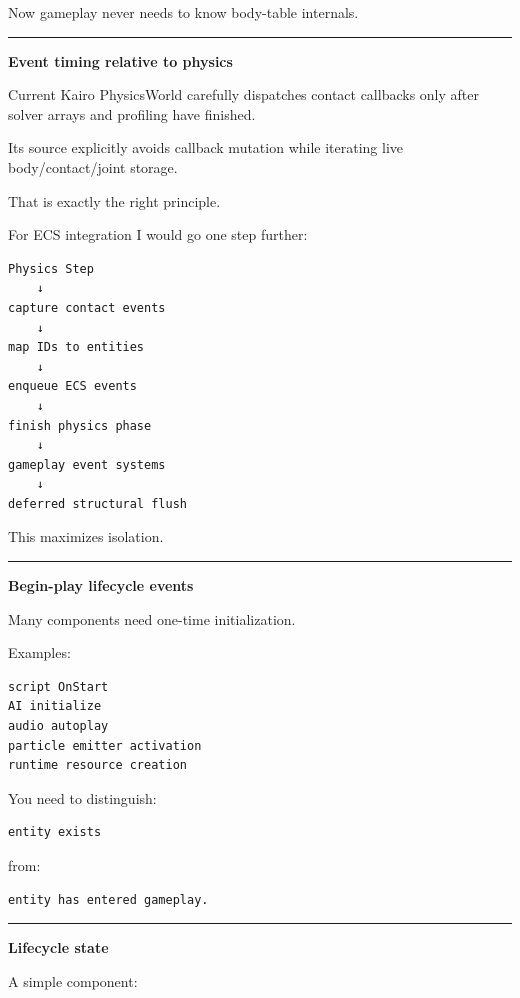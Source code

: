 Now gameplay never needs to know body-table internals.

\begin{center}\rule{0.5\linewidth}{0.5pt}\end{center}

\textbf{Event timing relative to physics}

Current Kairo PhysicsWorld carefully dispatches contact callbacks only after solver arrays and profiling have finished.

Its source explicitly avoids callback mutation while iterating live body/contact/joint storage.

That is exactly the right principle.

For ECS integration I would go one step further:

\begin{verbatim}
Physics Step
    ↓
capture contact events
    ↓
map IDs to entities
    ↓
enqueue ECS events
    ↓
finish physics phase
    ↓
gameplay event systems
    ↓
deferred structural flush
\end{verbatim}

This maximizes isolation.

\begin{center}\rule{0.5\linewidth}{0.5pt}\end{center}

\textbf{Begin-play lifecycle events}

Many components need one-time initialization.

Examples:

\begin{verbatim}
script OnStart
AI initialize
audio autoplay
particle emitter activation
runtime resource creation
\end{verbatim}

You need to distinguish:

\begin{verbatim}
entity exists
\end{verbatim}

from:

\begin{verbatim}
entity has entered gameplay.
\end{verbatim}

\begin{center}\rule{0.5\linewidth}{0.5pt}\end{center}

\textbf{Lifecycle state}

A simple component:

